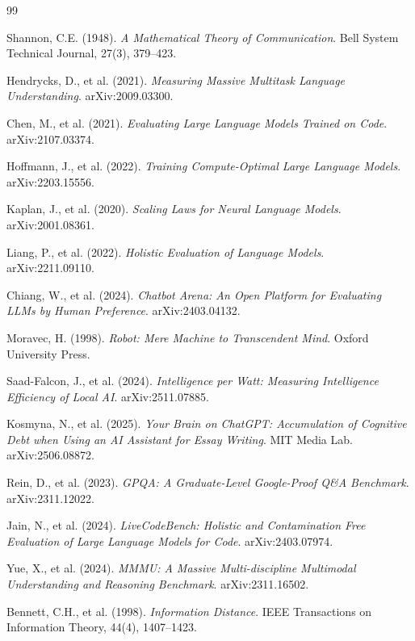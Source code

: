 \documentclass[12pt]{article}
\begin{document}

\begin{thebibliography}{99}

Shannon, C.E. (1948). \textit{A Mathematical Theory of Communication}. Bell System Technical Journal, 27(3), 379--423.

Hendrycks, D., et al. (2021). \textit{Measuring Massive Multitask Language Understanding}. arXiv:2009.03300.

Chen, M., et al. (2021). \textit{Evaluating Large Language Models Trained on Code}. arXiv:2107.03374.

Hoffmann, J., et al. (2022). \textit{Training Compute-Optimal Large Language Models}. arXiv:2203.15556.

Kaplan, J., et al. (2020). \textit{Scaling Laws for Neural Language Models}. arXiv:2001.08361.

Liang, P., et al. (2022). \textit{Holistic Evaluation of Language Models}. arXiv:2211.09110.

Chiang, W., et al. (2024). \textit{Chatbot Arena: An Open Platform for Evaluating LLMs by Human Preference}. arXiv:2403.04132.

Moravec, H. (1998). \textit{Robot: Mere Machine to Transcendent Mind}. Oxford University Press.

Saad-Falcon, J., et al. (2024). \textit{Intelligence per Watt: Measuring Intelligence Efficiency of Local AI}. arXiv:2511.07885.

Kosmyna, N., et al. (2025). \textit{Your Brain on ChatGPT: Accumulation of Cognitive Debt when Using an AI Assistant for Essay Writing}. MIT Media Lab. arXiv:2506.08872.


Rein, D., et al. (2023). \textit{GPQA: A Graduate-Level Google-Proof Q\&A Benchmark}. arXiv:2311.12022.

Jain, N., et al. (2024). \textit{LiveCodeBench: Holistic and Contamination Free Evaluation of Large Language Models for Code}. arXiv:2403.07974.

Yue, X., et al. (2024). \textit{MMMU: A Massive Multi-discipline Multimodal Understanding and Reasoning Benchmark}. arXiv:2311.16502.

Bennett, C.H., et al. (1998). \textit{Information Distance}. IEEE Transactions on Information Theory, 44(4), 1407--1423.


\end{thebibliography}
\end{document}
